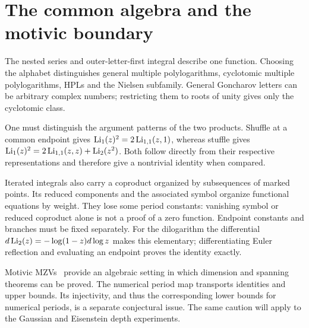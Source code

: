 \section{The common algebra and the motivic boundary}
The nested series and outer-letter-first integral describe one function.
Choosing the alphabet distinguishes general multiple polylogarithms,
cyclotomic multiple polylogarithms, HPLs and the Nielsen subfamily.
General Goncharov letters can be arbitrary complex numbers; restricting
them to roots of unity gives only the cyclotomic class.

One must distinguish the argument patterns of the two products. Shuffle
at a common endpoint gives $\operatorname{Li}_1(z)^2=2\operatorname{Li}_{1,1}(z,1)$, whereas
stuffle gives $\operatorname{Li}_1(z)^2=2\operatorname{Li}_{1,1}(z,z)+\operatorname{Li}_2(z^2)$.
Both follow directly from their respective representations and therefore
give a nontrivial identity when compared.

Iterated integrals also carry a coproduct organized by subsequences of
marked points. Its reduced components and the associated symbol organize
functional equations by weight. They lose some period constants: vanishing
symbol or reduced coproduct alone is not a proof of a zero function.
Endpoint constants and branches must be fixed separately.
For the dilogarithm the differential
$d\operatorname{Li}_2(z)=-\log(1-z)d\log z$ makes this elementary; differentiating
Euler reflection and evaluating an endpoint proves the identity exactly.

Motivic MZVs~\cite{Brown2012} provide an algebraic setting in which dimension and spanning
theorems can be proved. The numerical period map transports identities
and upper bounds. Its injectivity, and thus the corresponding lower bounds
for numerical periods, is a separate conjectural issue. The same caution
will apply to the Gaussian and Eisenstein depth experiments.







